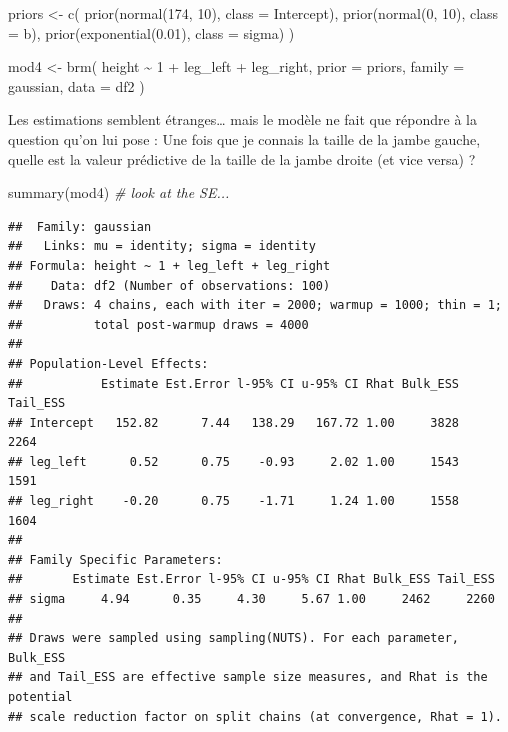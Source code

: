 \documentclass[
  a4paper,11pt,twoside,onecolumn,openright,final,oldfontcommands]{memoir}
\newenvironment{Shaded}{\begin{snugshade}}{\end{snugshade}}
\newcommand{\AttributeTok}[1]{\textcolor[rgb]{0.77,0.63,0.00}{#1}}
\newcommand{\CommentTok}[1]{\textcolor[rgb]{0.56,0.35,0.01}{\textit{#1}}}
\newcommand{\DecValTok}[1]{\textcolor[rgb]{0.00,0.00,0.81}{#1}}
\newcommand{\FloatTok}[1]{\textcolor[rgb]{0.00,0.00,0.81}{#1}}
\newcommand{\FunctionTok}[1]{\textcolor[rgb]{0.00,0.00,0.00}{#1}}
\newcommand{\NormalTok}[1]{#1}
\newcommand{\OtherTok}[1]{\textcolor[rgb]{0.56,0.35,0.01}{#1}}
\newcommand{\SpecialCharTok}[1]{\textcolor[rgb]{0.00,0.00,0.00}{#1}}
\theoremstyle{definition}
\theoremstyle{definition}
\theoremstyle{definition}
\theoremstyle{definition}
\theoremstyle{remark}
\begin{document}
\begin{Shaded}
\begin{Highlighting}[]
\NormalTok{priors }\OtherTok{\textless{}{-}} \FunctionTok{c}\NormalTok{(}
  \FunctionTok{prior}\NormalTok{(}\FunctionTok{normal}\NormalTok{(}\DecValTok{174}\NormalTok{, }\DecValTok{10}\NormalTok{), }\AttributeTok{class =}\NormalTok{ Intercept),}
  \FunctionTok{prior}\NormalTok{(}\FunctionTok{normal}\NormalTok{(}\DecValTok{0}\NormalTok{, }\DecValTok{10}\NormalTok{), }\AttributeTok{class =}\NormalTok{ b),}
  \FunctionTok{prior}\NormalTok{(}\FunctionTok{exponential}\NormalTok{(}\FloatTok{0.01}\NormalTok{), }\AttributeTok{class =}\NormalTok{ sigma)}
\NormalTok{  )}

\NormalTok{mod4 }\OtherTok{\textless{}{-}} \FunctionTok{brm}\NormalTok{(}
\NormalTok{  height }\SpecialCharTok{\textasciitilde{}} \DecValTok{1} \SpecialCharTok{+}\NormalTok{ leg\_left }\SpecialCharTok{+}\NormalTok{ leg\_right,}
  \AttributeTok{prior =}\NormalTok{ priors,}
  \AttributeTok{family =}\NormalTok{ gaussian,}
  \AttributeTok{data =}\NormalTok{ df2}
\NormalTok{  )}
\end{Highlighting}
\end{Shaded}

Les estimations semblent étranges\ldots{} mais le modèle ne fait que répondre à la question qu'on lui pose : Une fois que je connais la taille de la jambe gauche, quelle est la valeur prédictive de la taille de la jambe droite (et vice versa) ?

\begin{Shaded}
\begin{Highlighting}[]
\FunctionTok{summary}\NormalTok{(mod4) }\CommentTok{\# look at the SE...}
\end{Highlighting}
\end{Shaded}

\begin{verbatim}
##  Family: gaussian 
##   Links: mu = identity; sigma = identity 
## Formula: height ~ 1 + leg_left + leg_right 
##    Data: df2 (Number of observations: 100) 
##   Draws: 4 chains, each with iter = 2000; warmup = 1000; thin = 1;
##          total post-warmup draws = 4000
## 
## Population-Level Effects: 
##           Estimate Est.Error l-95% CI u-95% CI Rhat Bulk_ESS Tail_ESS
## Intercept   152.82      7.44   138.29   167.72 1.00     3828     2264
## leg_left      0.52      0.75    -0.93     2.02 1.00     1543     1591
## leg_right    -0.20      0.75    -1.71     1.24 1.00     1558     1604
## 
## Family Specific Parameters: 
##       Estimate Est.Error l-95% CI u-95% CI Rhat Bulk_ESS Tail_ESS
## sigma     4.94      0.35     4.30     5.67 1.00     2462     2260
## 
## Draws were sampled using sampling(NUTS). For each parameter, Bulk_ESS
## and Tail_ESS are effective sample size measures, and Rhat is the potential
## scale reduction factor on split chains (at convergence, Rhat = 1).
\end{verbatim}
\end{document}
